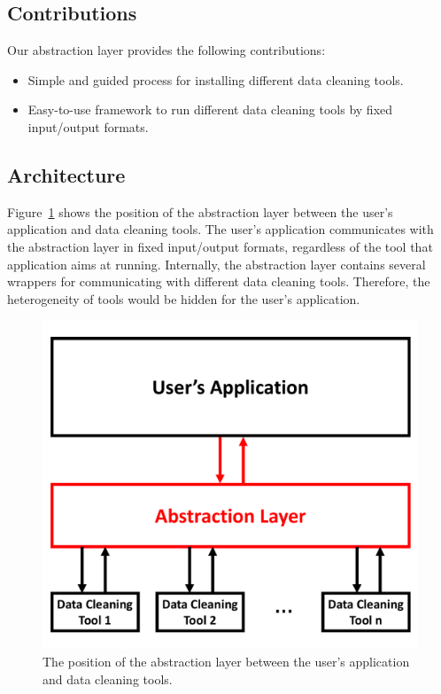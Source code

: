 \documentclass[12pt]{article}
\begin{document}
\subsection{Contributions}
Our abstraction layer provides the following contributions:
\begin{itemize}
	\item Simple and guided process for installing different data cleaning tools.
	\item Easy-to-use framework to run different data cleaning tools by fixed input/output formats.
\end{itemize}


\subsection{Architecture}
Figure~\ref{figure:architecture} shows the position of the abstraction layer between the user's application and data cleaning tools. The user's application communicates with the abstraction layer in fixed input/output formats, regardless of the tool that application aims at running. Internally, the abstraction layer contains several wrappers for communicating with different data cleaning tools. Therefore, the heterogeneity of tools would be hidden for the user's application.

\begin{figure}[!h]
	\centering
	\includegraphics[scale=0.3]{attachments/architecture}
	\caption{The position of the abstraction layer between the user's application and data cleaning tools.}
	\label{figure:architecture}
\end{figure}
\end{document}
